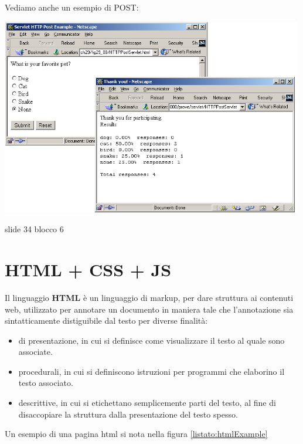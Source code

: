 \documentclass[a4paper,12pt, oneside]{book}
\begin{document}
\newpage
Vediamo anche un esempio di POST:
\begin{center}
	\includegraphics[scale=0.7]{img/post.png}
\end{center}
slide 34 blocco 6 
\chapter{HTML + CSS + JS}
Il linguaggio \textbf{HTML} è un linguaggio di markup, per dare struttura ai contenuti web,
utilizzato per annotare un documento in maniera tale che l'annotazione sia sintatticamente
distiguibile dal testo per diverse finalità:
\begin{itemize}
    \item di presentazione, in cui si definisce come visualizzare il testo al quale sono associate.
    \item procedurali, in cui si definiscono istruzioni per programmi che elaborino il testo associato.
    \item descrittive, in cui si etichettano semplicemente parti del testo, 
        al fine di disaccopiare la struttura dalla presentazione del testo spesso.
\end{itemize}
Un esempio di una pagina html si nota nella figura \ref{listato:htmlExample}
\end{document}
